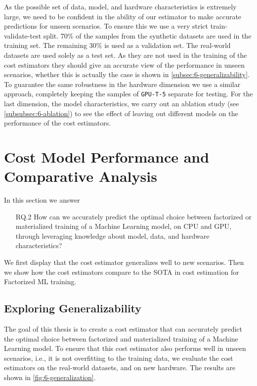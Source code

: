 As the possible set of data, model, and hardware characteristics is extremely large, we need to be confident in the ability of our estimator to make accurate predictions for unseen scenarios. To ensure this we use a very strict train-validate-test split. 70\% of the samples from the synthetic datasets are used in the training set. The remaining 30\% is used as a validation set. The real-world datasets are used solely as a test set. As they are not used in the training of the cost estimators they should give an accurate view of the performance in unseen scenarios, whether this is actually the case is shown in \autoref{subsec:6-generalizability}. To guarantee the same robustness in the hardware dimension we use a similar approach, completely keeping the samples of \texttt{GPU-T-5} separate for testing. For the last dimension, the model characteristics, we carry out an ablation study (see \autoref{subsubsec:6-ablation}) to see the effect of leaving out different models on the performance of the cost estimators.



\section{Cost Model Performance and Comparative Analysis}
\label{sec:eval-model-evaluation}

In this section we answer
\begin{itemize}
  \item[RQ.2] How can we accurately predict the optimal choice between factorized or materialized training of a Machine Learning model, on CPU and GPU, through leveraging knowledge about model, data, and hardware characteristics?
\end{itemize}

We first display that the cost estimator generalizes well to new scenarios. Then we show how the cost estimators compare to the SOTA in cost estimation for Factorized ML training.

\subsection{Exploring Generalizability}
\label{subsec:6-generalizability}
The goal of this thesis is to create a cost estimator that can accurately predict the optimal choice between factorized and materialized training of a Machine Learning model. To ensure that this cost estimator also performs well in unseen scenarios, i.e., it is not overfitting to the training data, we evaluate the cost estimators on the real-world datasets, and on new hardware. The results are shown in \autoref{fig:6-generalization}.

